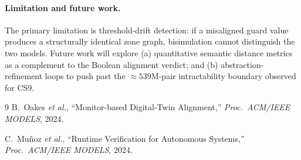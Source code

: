 \documentclass[10pt,a4paper]{article}
\begin{document}
\paragraph{Limitation and future work.}
The primary limitation is threshold-drift detection: if a misaligned guard
value produces a structurally identical zone graph, bisimulation cannot
distinguish the two models. Future work will explore
(a) quantitative semantic distance metrics as a complement to the Boolean
alignment verdict; and
(b) abstraction-refinement loops to push past the $\approx 539\text{M}$-pair
intractability boundary observed for CS9.

\begin{thebibliography}{9}
  B.~Oakes \emph{et al.}, ``Monitor-based Digital-Twin Alignment,''
  \emph{Proc.\ ACM/IEEE MODELS}, 2024.

  C.~Mu\~noz \emph{et al.}, ``Runtime Verification for Autonomous Systems,''
  \emph{Proc.\ ACM/IEEE MODELS}, 2024.
\end{thebibliography}
\end{document}
